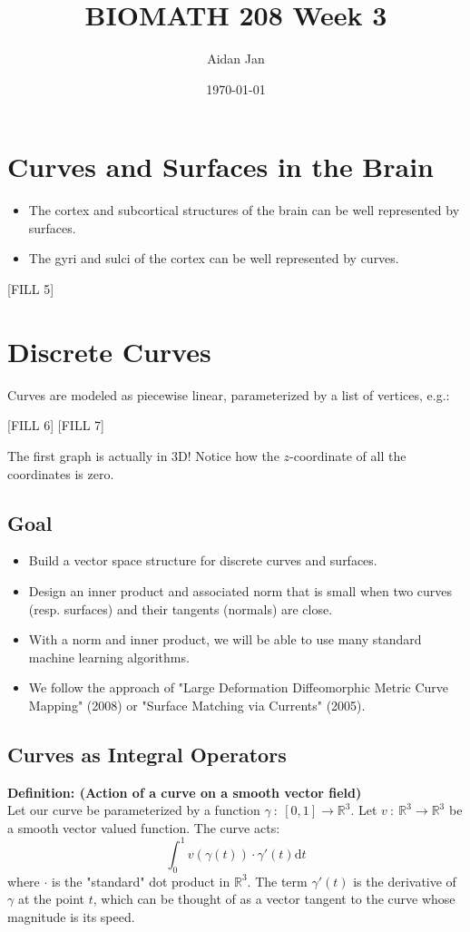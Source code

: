 \documentclass[10pt]{article}
\title{BIOMATH 208 Week 3}
\author{Aidan Jan}
\date{\today}
\newcommand{\R}{\mathbb{R}}
\begin{document}
\maketitle
\section*{Curves and Surfaces in the Brain}
\begin{itemize}
    \item The cortex and subcortical structures of the brain can be well represented by surfaces.
    \item The gyri and sulci of the cortex can be well represented by curves.
\end{itemize}
\begin{center}
    [FILL 5]
\end{center}
\section*{Discrete Curves}
Curves are modeled as piecewise linear, parameterized by a list of vertices, e.g.:
\begin{center}
    [FILL 6]
    [FILL 7]
\end{center}
The first graph is actually in 3D!  Notice how the $z$-coordinate of all the coordinates is zero.

\subsection*{Goal}
\begin{itemize}
    \item Build a vector space structure for discrete curves and surfaces.
    \item Design an inner product and associated norm that is small when two curves (resp. surfaces) and their tangents (normals) are close.
    \item With a norm and inner product, we will be able to use many standard machine learning algorithms.
    \item We follow the approach of "Large Deformation Diffeomorphic Metric Curve Mapping" (2008) or "Surface Matching via Currents" (2005).
\end{itemize}

\subsection*{Curves as Integral Operators}
\textbf{Definition: (Action of a curve on a smooth vector field)}\\
Let our curve be parameterized by a function $\gamma \::\: [0, 1] \rightarrow \mathbb{R}^3$.  Let $v \::\: \R^3 \rightarrow \R^3$ be a smooth vector valued function.  The curve acts:
\[\int_0^1 v(\gamma(t)) \cdot \gamma'(t) \text{d} t\]
where $\cdot$ is the "standard" dot product in $\R^3$.  The term $\gamma'(t)$ is the derivative of $\gamma$ at the point $t$, which can be thought of as a vector tangent to the curve whose magnitude is its speed.
\end{document}
